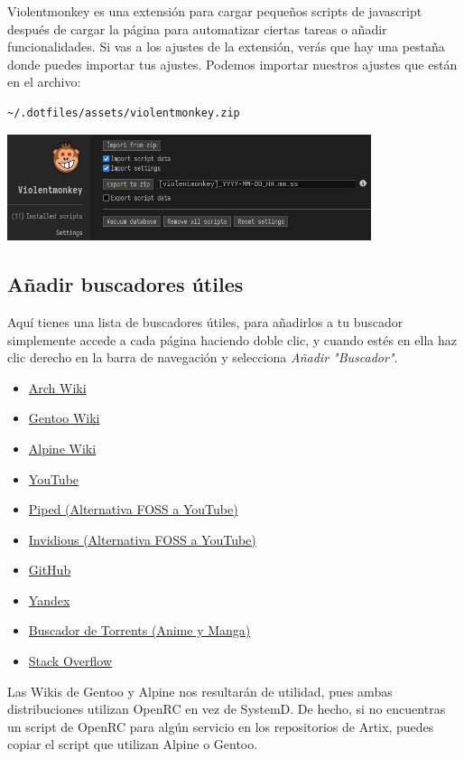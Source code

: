 \documentclass[12pt]{article}
\begin{document}
Violentmonkey es una extensión para cargar pequeños scripts de javascript después de cargar la página para automatizar ciertas tareas o añadir funcionalidades. Si vas a los ajustes de la extensión, verás que hay una pestaña donde puedes importar tus ajustes. Podemos importar nuestros ajustes que están en el archivo:

\begin{verbatim}
~/.dotfiles/assets/violentmonkey.zip
\end{verbatim}

\begin{center}
	\includegraphics[width=0.8\textwidth]{images/violentmonkey.jpg}
\end{center}

\subsection{Añadir buscadores útiles}

Aquí tienes una lista de buscadores útiles, para añadirlos a tu buscador simplemente accede a cada página haciendo doble clic, y cuando estés en ella haz clic derecho en la barra de navegación y selecciona \emph{Añadir "Buscador"}.

\begin{multicols}{2}
\begin{itemize}
\setlength\itemindent{-0.5em}
\setlength\itemsep{-0.35em}
\item \href{https://wiki.archlinux.org/}{Arch Wiki}
\item \href{https://wiki.gentoo.org/wiki/Main_Page}{Gentoo Wiki}
\item \href{https://wiki.alpinelinux.org/wiki/Main_Page}{Alpine Wiki}
\item \href{https://www.youtube.com/}{YouTube}
\item \href{https://nyc1.pi.ggtyler.dev/trending}{Piped (Alternativa FOSS a YouTube)}
\item \href{https://iv.ggtyler.dev/feed/popular}{Invidious (Alternativa FOSS a YouTube)}
\item \href{https://github.com/}{GitHub}
\item \href{https://yandex.com/}{Yandex}
\item \href{https://nyaa.si/}{Buscador de Torrents (Anime y Manga)}
\item \href{https://stackoverflow.com/}{Stack Overflow}
\end{itemize}
\end{multicols}

Las Wikis de Gentoo y Alpine nos resultarán de utilidad, pues ambas distribuciones utilizan OpenRC en vez de SystemD. De hecho, si no encuentras un script de OpenRC para algún servicio en los repositorios de Artix, puedes copiar el script que utilizan Alpine o Gentoo.
\end{document}
